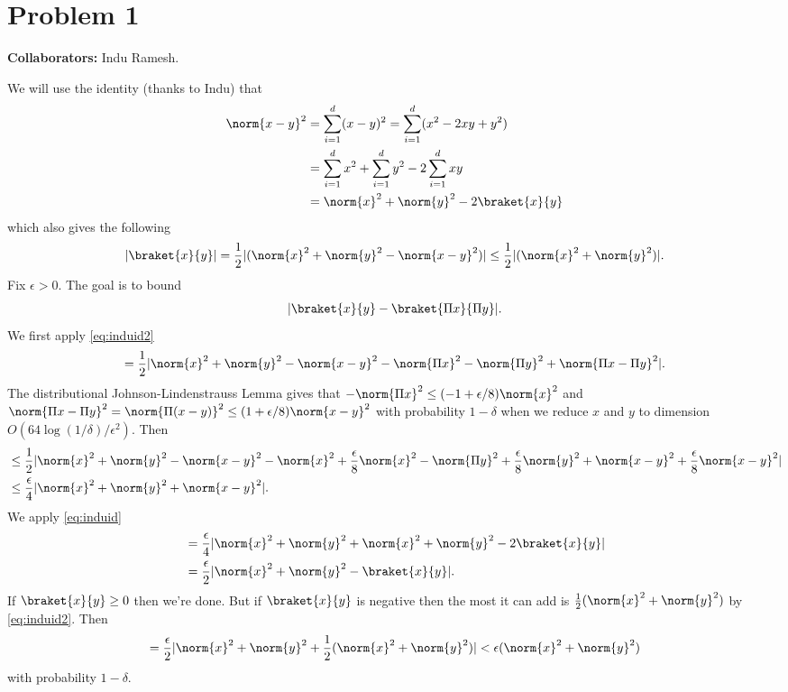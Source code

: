 
\section*{Problem 1}
\textbf{Collaborators:} Indu Ramesh.
\medskip

We will use the identity (thanks to Indu) that
\begin{align}\label{eq:induid}
    \norm{x-y}^2 &= \sum_{i=1}^d(x-y)^2
    = \sum_{i=1}^d (x^2 -2xy + y^2)
    \nonumber \\
    &= \sum_{i=1}^d x^2 + \sum_{i=1}^d y^2 -
    2 \sum_{i=1}^d xy \nonumber \\
    &= \norm{x}^2 + \norm{y}^2 - 2\braket{x}{y}
\end{align}
which also gives the following
\begin{align}\label{eq:induid2}
    |\braket{x}{y}| =
    \frac{1}{2} |(\norm{x}^2 + \norm{y}^2 - \norm{x-y}^2)|
    \leq \frac{1}{2} |(\norm{x}^2 + \norm{y}^2)|.
\end{align}
Fix $\epsilon > 0$.
The goal is to bound
\begin{align}
    |\braket{x}{y} - \braket{\Pi x}{\Pi y}|.
    \nonumber
\end{align}
We first apply \autoref{eq:induid2}
\begin{align}
    = \frac{1}{2}|\norm{x}^2 + \norm{y}^2
    - \norm{x-y}^2
    - \norm{\Pi x}^2 - \norm{\Pi y}^2
    + \norm{\Pi x - \Pi y}^2|.
    \nonumber
\end{align}
The distributional Johnson-Lindenstrauss Lemma
gives that $-\norm{\Pi x}^2\leq (-1+\epsilon/8)\norm{x}^2$
and $\norm{\Pi x - \Pi y}^2 = \norm{\Pi (x-y)}^2 \leq
(1+\epsilon/8)\norm{x-y}^2$
with probability $1-\delta$
when we reduce $x$ and $y$ to dimension
$O(64\log(1/\delta)/\epsilon^2)$.
Then
\begin{align}
    &\leq \frac{1}{2}|\norm{x}^2 + \norm{y}^2
    - \norm{x-y}^2
    - \norm{x}^2 + \frac{\epsilon}{8} \norm{x}^2
    - \norm{\Pi y}^2 + \frac{\epsilon}{8} \norm{y}^2
    + \norm{x - y}^2 + \frac{\epsilon}{8} \norm{x-y}^2 |
    \nonumber \\
    & \leq \frac{\epsilon}{4} | \norm{x}^2
    + \norm{y}^2 + \norm{x-y}^2 |.
    \nonumber
\end{align}
We apply \autoref{eq:induid}
\begin{align}
    &= \frac{\epsilon}{4} | \norm{x}^2 + \norm{y}^2
    + \norm{x}^2 + \norm{y}^2 - 2\braket{x}{y}
    | \nonumber \\
    &= \frac{\epsilon}{2} | \norm{x}^2 + \norm{y}^2
    - \braket{x}{y} |.
    \nonumber
\end{align}
If $\braket{x}{y} \geq 0$ then we're done.
But if $\braket{x}{y}$ is negative
then the most it can add is
$\frac{1}{2} (\norm{x}^2 + \norm{y}^2)$
by \autoref{eq:induid2}.
Then
\begin{align}
    = \frac{\epsilon}{2} | \norm{x}^2 + \norm{y}^2
    + \frac{1}{2} (\norm{x}^2 + \norm{y}^2)|
    < \epsilon (\norm{x}^2 + \norm{y}^2)
    \nonumber
\end{align}
with probability $1-\delta$.
    
